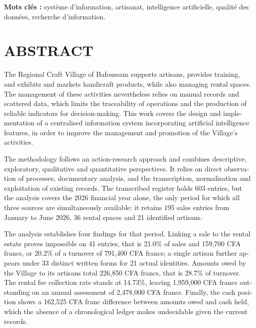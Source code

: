 \vspace{0.6em}
\noindent\textbf{Mots clés :} système d'information, artisanat, intelligence artificielle, qualité des données, recherche d'information.
\clearpage

\chapter*{ABSTRACT}
\begin{otherlanguage}{english}

The Regional Craft Village of Bafoussam supports artisans, provides training, and exhibits and markets handicraft products, while also managing rental spaces. The management of these activities nevertheless relies on manual records and scattered data, which limits the traceability of operations and the production of reliable indicators for decision-making. This work covers the design and implementation of a centralised information system incorporating artificial intelligence features, in order to improve the management and promotion of the Village's activities.

The methodology follows an action-research approach and combines descriptive, exploratory, qualitative and quantitative perspectives. It relies on direct observation of processes, documentary analysis, and the transcription, normalisation and exploitation of existing records. The transcribed register holds 603 entries, but the analysis covers the 2026 financial year alone, the only period for which all three sources are simultaneously available: it retains 195 sales entries from January to June 2026, 36 rental spaces and 21 identified artisans.

The analysis establishes four findings for that period. Linking a sale to the rental estate proves impossible on 41 entries, that is 21.0\% of sales and 159,700 CFA francs, or 20.2\% of a turnover of 791,400 CFA francs; a single artisan further appears under 33 distinct written forms for 21 actual identities. Amounts owed by the Village to its artisans total 226,850 CFA francs, that is 28.7\% of turnover. The rental fee collection rate stands at 14.73\%, leaving 1,959,000 CFA francs outstanding on an annual assessment of 2,478,000 CFA francs. Finally, the cash position shows a 162,525 CFA franc difference between amounts owed and cash held, which the absence of a chronological ledger makes undecidable given the current records.


\end{otherlanguage}
